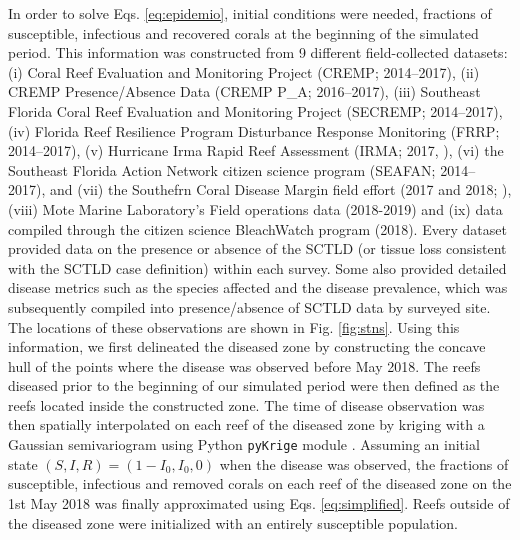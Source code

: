 In order to solve Eqs. \ref{eq:epidemio}, initial conditions were needed, \ie fractions of susceptible, infectious and recovered corals at the beginning of the simulated period. This information was constructed from 9 different field-collected datasets: (i) Coral Reef Evaluation and Monitoring Project (CREMP; 2014–2017), (ii) CREMP Presence/Absence Data (CREMP P\_A; 2016–2017), (iii) Southeast Florida Coral Reef Evaluation and Monitoring Project (SECREMP; 2014–2017), (iv) Florida Reef Resilience Program Disturbance Response Monitoring (FRRP; 2014–2017), (v) Hurricane Irma Rapid Reef Assessment (IRMA; 2017, \cite{viehman2018}), (vi) the Southeast Florida Action Network citizen science program (SEAFAN; 2014–2017), and (vii) the Southefrn Coral Disease Margin field effort (2017 and 2018; \cite{neely2018surveying}), (viii) Mote Marine Laboratory’s Field operations data (2018-2019) and (ix) data compiled through the citizen science BleachWatch program (2018). Every dataset provided data on the presence or absence of the SCTLD (or tissue loss consistent with the SCTLD case definition) within each survey. Some also provided detailed disease metrics such as the species affected and the disease prevalence, which was subsequently compiled into presence/absence of SCTLD data by surveyed site. The locations of these observations are shown in Fig. \ref{fig:stns}. Using this information, we first delineated the diseased zone by constructing the concave hull of the points where the disease was observed before May 2018. The reefs diseased prior to the beginning of our simulated period were then defined as the reefs located inside the constructed zone. The time of disease observation was then spatially interpolated on each reef of the diseased zone by kriging with a Gaussian semivariogram using Python \texttt{pyKrige} module \citep{murphy2014pykrige}. Assuming an initial state $(S,I,R)=(1-I_0, I_0, 0)$ when the disease was observed, the fractions of susceptible, infectious and removed corals on each reef of the diseased zone on the 1st May 2018 was finally approximated using Eqs. \ref{eq:simplified}. Reefs outside of the diseased zone were initialized with an entirely susceptible population.  

